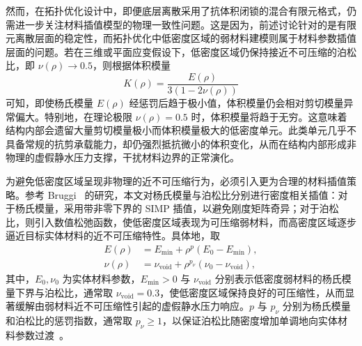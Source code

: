 

然而，在拓扑优化设计中，即便底层离散采用了抗体积闭锁的混合有限元格式，仍需进一步关注材料插值模型的物理一致性问题。这是因为，前述讨论针对的是有限元离散层面的稳定性，而拓扑优化中低密度区域的弱材料建模则属于材料参数插值层面的问题。若在三维或平面应变假设下，低密度区域仍保持接近不可压缩的泊松比，即 $\nu(\rho)\to0.5$，则根据体积模量
\[
K(\rho)=\frac{E(\rho)}{3(1-2\nu(\rho))}
\]
可知，即使杨氏模量 $E(\rho)$ 经惩罚后趋于极小值，体积模量仍会相对剪切模量异常偏大。特别地，在理论极限 $\nu(\rho)=0.5$ 时，体积模量将趋于无穷。这意味着结构内部会遗留大量剪切模量极小而体积模量极大的低密度单元。此类单元几乎不具备常规的抗剪承载能力，却仍强烈抵抗微小的体积变化，从而在结构内部形成非物理的虚假静水压力支撑，干扰材料边界的正常演化。

为避免低密度区域呈现非物理的近不可压缩行为，必须引入更为合理的材料插值策略。参考 Bruggi~\cite{bruggiTopologyOptimizationIncompressible2007a} 的研究，本文对杨氏模量与泊松比分别进行密度相关插值：对于杨氏模量，采用带非零下界的 SIMP 插值，以避免刚度矩阵奇异；对于泊松比，则引入数值松弛函数，使低密度区域表现为可压缩弱材料，而高密度区域逐步逼近目标实体材料的近不可压缩特性。具体地，取
\[
\begin{aligned}  
	E(\rho) &= E_{\min} + \rho^p (E_{0} - E_{\min}), \\  
	\nu(\rho) &= \nu_{\text{void}} + \rho^{p_{\nu}} (\nu_{0} - \nu_{\text{void}}),  
\end{aligned}
\]
其中，$E_0,\nu_0$ 为实体材料参数，$E_{\min}>0$ 与 $\nu_{\mathrm{void}}$ 分别表示低密度弱材料的杨氏模量下界与泊松比，通常取 $\nu_{\mathrm{void}}=0.3$，使低密度区域保持良好的可压缩性，从而显著缓解由弱材料近不可压缩性引起的虚假静水压力响应。$p$ 与 $p_\nu$ 分别为杨氏模量和泊松比的惩罚指数，通常取 $p_\nu\ge 1$，以保证泊松比随密度增加单调地向实体材料参数过渡~\cite{bruggiTopologyOptimizationIncompressible2007a}。

